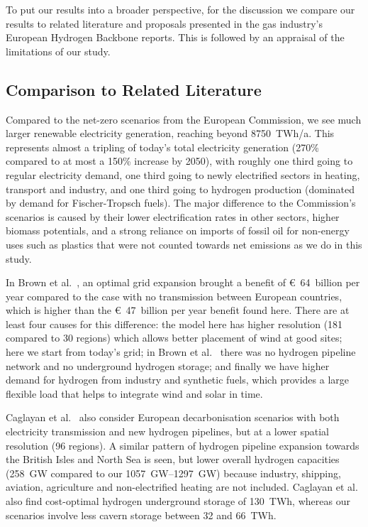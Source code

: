 To put our results into a broader perspective, for the discussion we compare our
results to related literature and proposals presented in the gas industry's
European Hydrogen Backbone reports. This is followed by an appraisal of the
limitations of our study.

\subsection*{Comparison to Related Literature}

Compared to the net-zero scenarios from the European
Commission\cite{in-depth_2018}, we see much larger renewable electricity
generation, reaching beyond 8750~TWh/a. This represents almost a tripling of
today's total electricity generation (270\% compared to at most a 150\% increase
by 2050\cite{in-depth_2018}), with roughly one third going to regular
electricity demand, one third going to newly electrified sectors in heating,
transport and industry, and one third going to hydrogen production (dominated by
demand for Fischer-Tropsch fuels). The major difference to the Commission's
scenarios\cite{in-depth_2018} is caused by their lower electrification rates in
other sectors, higher biomass potentials, and a strong reliance on imports of
fossil oil for non-energy uses such as plastics that were not counted towards
net emissions as we do in this study.

In Brown et al.~\cite{brownSynergiesSector2018}, an optimal grid expansion
brought a benefit of \euro~64~billion per year compared to the case with no
transmission between European countries, which is higher than the
\euro~47~billion per year benefit found here. There are at least four causes for
this difference: the model here has higher resolution (181 compared to 30
regions) which allows better placement of wind at good sites; here we start from
today's grid; in Brown et al.~\cite{brownSynergiesSector2018} there was no
hydrogen pipeline network and no underground hydrogen storage; and finally we
have higher demand for hydrogen from industry and synthetic fuels, which
provides a large flexible load that helps to integrate wind and solar in time.

Caglayan et al.~\cite{Caglayan2019} also consider European decarbonisation
scenarios with both electricity transmission and new hydrogen pipelines, but at
a lower spatial resolution (96 regions). A similar pattern of hydrogen pipeline
expansion towards the British Isles and North Sea is seen, but lower overall
hydrogen capacities (258~GW compared to our \SIrange{1057}{1297}{\giga\watt})
because industry, shipping, aviation, agriculture and non-electrified heating
are not included. Caglayan et al.~\cite{Caglayan2019} also find cost-optimal
hydrogen underground storage of 130~TWh, whereas our scenarios involve less
cavern storage between 32 and 66~TWh.

